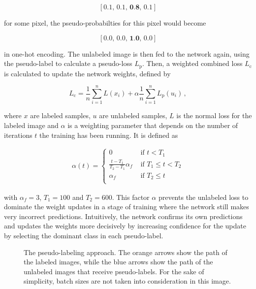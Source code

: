 \[ [0.1,\, 0.1,\, \textbf{0.8},\, 0.1] \]

\noindent for some pixel, the pseudo-probabilties for this pixel would become

\[ [0.0,\, 0.0,\, \textbf{1.0},\, 0.0] \]

\noindent in one-hot encoding. The unlabeled image is then fed to the network again, using the pseudo-label to calculate a pseudo-loss $L_\text{p}$. Then, a weighted combined loss $L_\text{c}$ is calculated to update the network weights, defined by

\[ L_\text{c} = \frac{1}{n} \sum \limits_{i=1}^{n} L(x_i) + \alpha \frac{1}{n} \sum \limits_{i=1}^{n} L_\text{p}(u_i) \,, \]

\noindent where $x$ are labeled samples, $u$ are unlabeled samples, $L$ is the normal loss for the labeled image and $\alpha$ is a weighting parameter that depends on the number of iterations $t$ the training has been running. It is defined as

\begin {align}
\alpha(t) = \begin{cases} 0 &\text{ if } t < T_1 \\
				\frac{t - T_1}{T_2 - T_1} \alpha_f &\text{ if } T_1 \leq t < T_2 \\
				\alpha_f &\text { if } T_2 \leq t \\
	        \end{cases}
\end {align}

\noindent with $\alpha_f = 3$, $T_1 = 100$ and $T_2 = 600$. This factor $\alpha$ prevents the unlabeled loss to dominate the weight updates in a stage of training where the network still makes very incorrect predictions. Intuitively, the network confirms its own predictions and updates the weights more decisively by increasing confidence for the update by selecting the dominant class in each pseudo-label.\\

\begin {figure}[!htb]
	\begin{center}
		\scalebox{0.45}{}
	\end{center}

		\caption[Pseudo-Labeling.]{The pseudo-labeling approach. The orange arrows show the path of the labeled images, while the blue arrows show the path of the unlabeled images that receive pseudo-labels. For the sake of simplicity, batch sizes are not taken into consideration in this image.}
		\label{fig:pseudo_label}
\end {figure}

